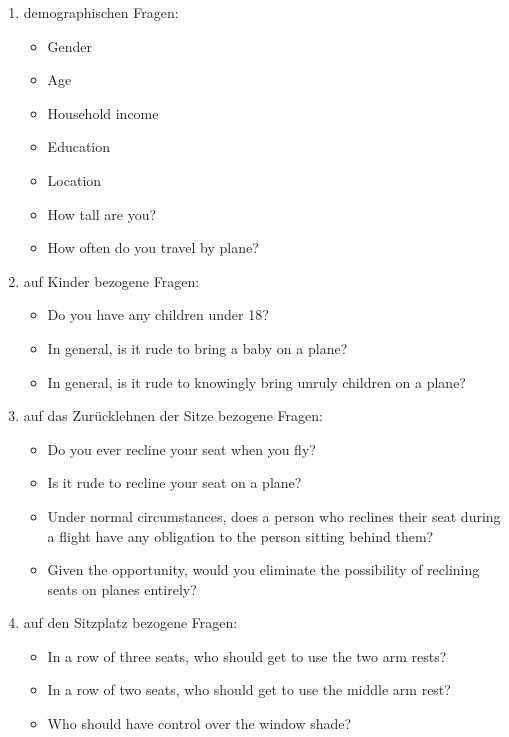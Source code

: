 \documentclass{mi-seminar}
\begin{document}
\begin{enumerate}

\item demographischen Fragen:
\begin{itemize}
\item Gender
\item Age
\item Household income
\item Education 
\item Location
\item How tall are you? 
\item How often do you travel by plane? 
\newline \newline
\end{itemize}


\item auf Kinder bezogene Fragen:
\begin{itemize}
\item Do you have any children under 18?
\item In general, is it rude to bring a baby on a plane?
\item In general, is it rude to knowingly bring unruly children on a plane? 
\newline \newline
\end{itemize}


\item auf das Zurücklehnen der Sitze bezogene Fragen: 
\begin{itemize}
\item Do you ever recline your seat when you fly?
\item Is it rude to recline your seat on a plane? 
\item Under normal circumstances, does a person who reclines their seat during a flight have any obligation to the person sitting behind them? 
\item Given the opportunity, would you eliminate the possibility of reclining seats on planes entirely?
\newline \newline
\end{itemize}


\item auf den Sitzplatz bezogene Fragen: 
\begin{itemize}
\item In a row of three seats, who should get to use the two arm rests? 
\item In a row of two seats, who should get to use the middle arm rest?
\item Who should have control over the window shade?
\newline \newline
\end{itemize}



\end{enumerate}
\end{document}
